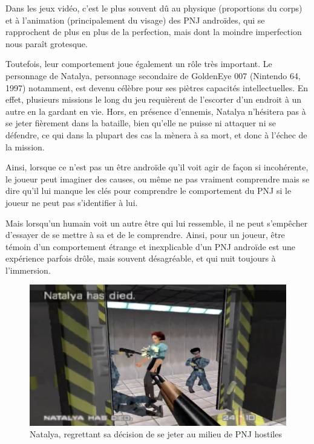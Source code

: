 \documentclass[a4paper, 12pt]{article} %
\begin{document}
Dans les jeux vidéo, c’est le plus souvent dû au physique (proportions du corps) et à l’animation (principalement du visage) des PNJ androïdes, qui se rapprochent de plus en plus de la perfection, mais dont la moindre imperfection nous paraît grotesque.


Toutefois, leur comportement joue également un rôle très important. Le personnage de Natalya, personnage secondaire de GoldenEye 007 (Nintendo 64, 1997) notamment, est devenu célèbre pour ses piètres capacités intellectuelles. En effet, plusieurs missions le long du jeu requièrent de l’escorter d’un endroit à un autre en la gardant en vie. Hors, en présence d’ennemis, Natalya n’hésitera pas à se jeter fièrement dans la bataille, bien qu’elle ne puisse ni attaquer ni se défendre, ce qui dans la plupart des cas la mènera à sa mort, et donc à l’échec de la mission.

\newpage
Ainsi, lorsque ce n’est pas un être androïde qu’il voit agir de façon si incohérente, le joueur peut imaginer des causes, ou même ne pas vraiment comprendre mais se dire qu’il lui manque les clés pour comprendre le comportement du PNJ si le joueur ne peut pas s’identifier à lui. 

Mais lorsqu’un humain voit un autre être qui lui ressemble, il ne peut s’empêcher d’essayer de se mettre à sa et de le comprendre. Ainsi, pour un joueur, être témoin d’un comportement étrange et inexplicable d’un PNJ androïde est une expérience parfois drôle, mais souvent désagréable, et qui nuit toujours à l’immersion.

\begin{figure}[!h]%
	\begin{center} 
		\includegraphics[width=0.60\columnwidth]{images/natalya.png}%
		\caption{Natalya, regrettant sa décision de se jeter au milieu de PNJ hostiles}%
	\end{center}
\end{figure}
\end{document}
